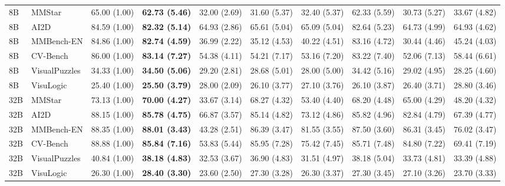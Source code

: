 \documentclass[10pt,a4paper,landscape]{article}
\newcommand{\tnote}[1]{\par\vspace{3pt}{\footnotesize #1}\par}
\begin{document}
\begin{table}[!ht]
\begin{tabular}{@{}llrrrrrrrr@{}}
\midrule
8B & MMStar & 65.00 (1.00) & \textbf{62.73 (5.46)} & 32.00 (2.69) & 31.60 (5.37) & 32.40 (5.37) & 62.33 (5.59) & 30.73 (5.27) & 33.67 (4.82)\\
8B & AI2D & 84.59 (1.00) & \textbf{82.32 (5.14)} & 64.93 (2.86) & 65.61 (5.04) & 65.09 (5.04) & 82.64 (5.23) & 64.73 (4.99) & 64.93 (4.62)\\
8B & MMBench-EN & 84.86 (1.00) & \textbf{82.74 (4.59)} & 36.99 (2.22) & 35.12 (4.53) & 40.22 (4.51) & 83.16 (4.72) & 30.44 (4.46) & 45.24 (4.03)\\
8B & CV-Bench & 86.00 (1.00) & \textbf{83.14 (7.27)} & 54.38 (4.11) & 54.21 (7.17) & 53.16 (7.20) & 83.22 (7.40) & 52.06 (7.13) & 58.44 (6.61)\\
8B & VisualPuzzles & 34.33 (1.00) & \textbf{34.50 (5.06)} & 29.20 (2.81) & 28.68 (5.01) & 28.00 (5.00) & 34.42 (5.16) & 29.02 (4.95) & 28.25 (4.60)\\
8B & VisuLogic & 25.40 (1.00) & \textbf{25.50 (3.79)} & 28.00 (2.09) & 26.10 (3.77) & 27.10 (3.76) & 26.10 (3.87) & 26.40 (3.71) & 28.80 (3.46)\\
\midrule
32B & MMStar & 73.13 (1.00) & \textbf{70.00 (4.27)} & 33.67 (3.14) & 68.27 (4.32) & 53.40 (4.40) & 68.20 (4.48) & 65.00 (4.29) & 48.20 (4.32)\\
32B & AI2D & 88.15 (1.00) & \textbf{85.78 (4.75)} & 66.87 (3.57) & 85.14 (4.82) & 73.12 (4.86) & 85.82 (4.96) & 82.84 (4.79) & 67.39 (4.77)\\
32B & MMBench-EN & 88.35 (1.00) & \textbf{88.01 (3.43)} & 43.28 (2.51) & 86.39 (3.47) & 81.55 (3.55) & 87.50 (3.60) & 86.31 (3.45) & 76.02 (3.47)\\
32B & CV-Bench & 88.88 (1.00) & \textbf{85.84 (7.16)} & 53.83 (5.44) & 85.95 (7.28) & 75.42 (7.45) & 85.71 (7.48) & 84.80 (7.22) & 69.41 (7.19)\\
32B & VisualPuzzles & 40.84 (1.00) & \textbf{38.18 (4.83)} & 32.53 (3.67) & 36.90 (4.83) & 31.51 (4.97) & 38.18 (5.04) & 33.73 (4.81) & 33.39 (4.88)\\
32B & VisuLogic & 26.30 (1.00) & \textbf{28.40 (3.30)} & 23.60 (2.50) & 27.30 (3.28) & 26.30 (3.37) & 27.30 (3.45) & 27.10 (3.26) & 23.70 (3.33)\\
\bottomrule\end{tabular}
\tnote{Bold identifies Ours; it does not denote the best score. Native is the baseline for each model and benchmark. All cells cover the complete input set with three repetitions (1,322,016 calls in total). Speedup is native latency divided by method latency; it excludes loading, packing, and initial graph capture. MMBench-EN uses provided-pass group accuracy, not full official CircularEval; 53 groups are incomplete. CV-Bench uses source-balanced accuracy; the other benchmarks use forced-choice exact accuracy. Three repetitions are timing replicates, not independent training seeds.}
\end{table}
\end{document}
